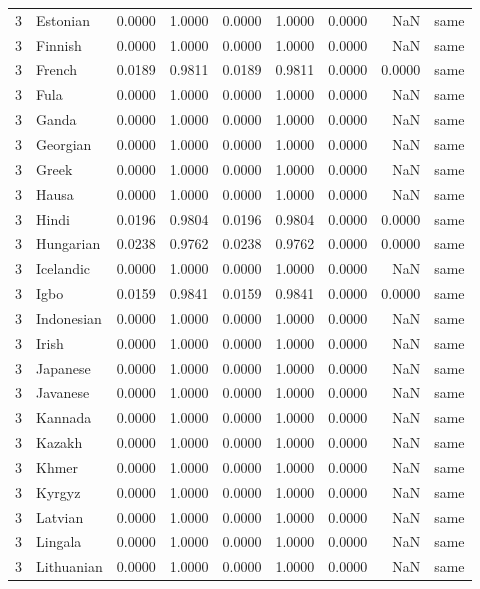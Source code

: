 \begin{tabular}{rlrrrrrrl}
3 & Estonian & 0.0000 & 1.0000 & 0.0000 & 1.0000 & 0.0000 & NaN & same \\
3 & Finnish & 0.0000 & 1.0000 & 0.0000 & 1.0000 & 0.0000 & NaN & same \\
3 & French & 0.0189 & 0.9811 & 0.0189 & 0.9811 & 0.0000 & 0.0000 & same \\
3 & Fula & 0.0000 & 1.0000 & 0.0000 & 1.0000 & 0.0000 & NaN & same \\
3 & Ganda & 0.0000 & 1.0000 & 0.0000 & 1.0000 & 0.0000 & NaN & same \\
3 & Georgian & 0.0000 & 1.0000 & 0.0000 & 1.0000 & 0.0000 & NaN & same \\
3 & Greek & 0.0000 & 1.0000 & 0.0000 & 1.0000 & 0.0000 & NaN & same \\
3 & Hausa & 0.0000 & 1.0000 & 0.0000 & 1.0000 & 0.0000 & NaN & same \\
3 & Hindi & 0.0196 & 0.9804 & 0.0196 & 0.9804 & 0.0000 & 0.0000 & same \\
3 & Hungarian & 0.0238 & 0.9762 & 0.0238 & 0.9762 & 0.0000 & 0.0000 & same \\
3 & Icelandic & 0.0000 & 1.0000 & 0.0000 & 1.0000 & 0.0000 & NaN & same \\
3 & Igbo & 0.0159 & 0.9841 & 0.0159 & 0.9841 & 0.0000 & 0.0000 & same \\
3 & Indonesian & 0.0000 & 1.0000 & 0.0000 & 1.0000 & 0.0000 & NaN & same \\
3 & Irish & 0.0000 & 1.0000 & 0.0000 & 1.0000 & 0.0000 & NaN & same \\
3 & Japanese & 0.0000 & 1.0000 & 0.0000 & 1.0000 & 0.0000 & NaN & same \\
3 & Javanese & 0.0000 & 1.0000 & 0.0000 & 1.0000 & 0.0000 & NaN & same \\
3 & Kannada & 0.0000 & 1.0000 & 0.0000 & 1.0000 & 0.0000 & NaN & same \\
3 & Kazakh & 0.0000 & 1.0000 & 0.0000 & 1.0000 & 0.0000 & NaN & same \\
3 & Khmer & 0.0000 & 1.0000 & 0.0000 & 1.0000 & 0.0000 & NaN & same \\
3 & Kyrgyz & 0.0000 & 1.0000 & 0.0000 & 1.0000 & 0.0000 & NaN & same \\
3 & Latvian & 0.0000 & 1.0000 & 0.0000 & 1.0000 & 0.0000 & NaN & same \\
3 & Lingala & 0.0000 & 1.0000 & 0.0000 & 1.0000 & 0.0000 & NaN & same \\
3 & Lithuanian & 0.0000 & 1.0000 & 0.0000 & 1.0000 & 0.0000 & NaN & same \\

\end{tabular}
